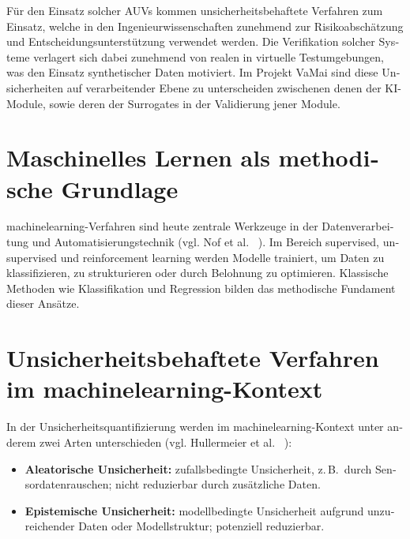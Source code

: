 \begin{otherlanguage}{ngerman}
Für den Einsatz solcher AUVs kommen unsicherheitsbehaftete Verfahren zum Einsatz, welche in den Ingenieurwissenschaften zunehmend zur Risikoabschätzung und Entscheidungsunterstützung verwendet werden. Die Verifikation solcher Systeme verlagert sich dabei zunehmend von realen in virtuelle Testumgebungen, was den Einsatz synthetischer Daten motiviert. Im Projekt VaMai sind diese Unsicherheiten auf verarbeitender Ebene zu unterscheiden zwischenen denen der KI-Module, sowie deren der Surrogates in der Validierung jener Module.


\section{Maschinelles Lernen als methodische Grundlage}

\gls{machinelearning}-Verfahren sind heute zentrale Werkzeuge in der Datenverarbeitung und Automatisierungstechnik (vgl. Nof et al. ~\parencite{Nof2023}). Im Bereich supervised, unsupervised und reinforcement learning werden Modelle trainiert, um Daten zu klassifizieren, zu strukturieren oder durch Belohnung zu optimieren. Klassische Methoden wie Klassifikation und Regression bilden das methodische Fundament dieser Ansätze.

\section{Unsicherheitsbehaftete Verfahren im \gls{machinelearning}-Kontext}

In der Unsicherheitsquantifizierung werden im \gls{machinelearning}-Kontext unter anderem zwei Arten unterschieden (vgl. Hullermeier et al. ~\parencite{Hullermeier2021}):

\begin{itemize}
  \item \textbf{\gls{Aleatorische Unsicherheit}:} zufallsbedingte Unsicherheit, z.\,B.\ durch Sensordatenrauschen; nicht reduzierbar durch zusätzliche Daten.
  \item \textbf{\gls{Epistemische Unsicherheit}:} modellbedingte Unsicherheit aufgrund unzureichender Daten oder Modellstruktur; potenziell reduzierbar.
\end{itemize}



\end{otherlanguage}
